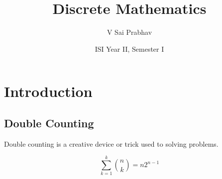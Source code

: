 \documentclass{book}
\title{Discrete Mathematics}
\author{V Sai Prabhav}
\date{ISI Year II, Semester I}
\begin{document}
\maketitle

\chapter{Introduction}
\section{Double Counting}
Double counting is a creative device or trick used to solving problems.
\begin{example}[]
  \[
    \sum_{k=1}^{k} \binom{n}{k} = n 2 ^{n-1}
  \]
\end{example}

\printindex
\end{document}

